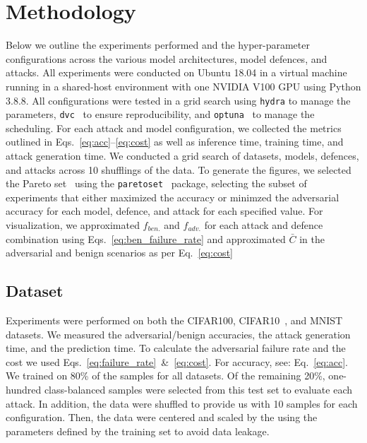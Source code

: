 \section{Methodology}
\label{methods}
Below we outline the experiments performed and the hyper-parameter configurations across the various model architectures, model defences, and attacks. All experiments were conducted on Ubuntu 18.04 in a virtual machine running in a shared-host environment with one NVIDIA V100 GPU using Python 3.8.8. All configurations were tested in a grid search using \texttt{hydra} \citep{hydra} to manage the parameters, \texttt{dvc}~\citep{dvc} to ensure reproducibility, and \texttt{optuna}~\citep{optuna} to manage the scheduling. For each attack and model configuration, we collected the metrics outlined in Eqs.~\ref{eq:acc}--\ref{eq:cost} as well as inference time, training time, and attack generation time. We conducted a grid search of datasets, models, defences, and attacks across 10 shufflings of the data. To generate the figures, we selected the Pareto set~\cite{jahan2016multi} using the \texttt{paretoset}~\citep{paretoset} package, selecting the subset of experiments that either maximized the accuracy or minimzed the adversarial accuracy for each model, defence, and attack for each specified value. For visualization, we approximated $f_{ben.}$ and $f_{adv.}$ for each attack and defence combination using Eqs.~\ref{eq:ben_failure_rate} and approximated $\bar{C}$ in the adversarial and benign scenarios as per Eq.~\ref{eq:cost}

\subsection{Dataset}
\label{dataset}
Experiments were performed on both the CIFAR100, CIFAR10~\citep{cifar}, and MNIST~\citep{mnist} datasets. We measured the adversarial/benign accuracies, the attack generation time, and the prediction time. To calculate the adversarial failure rate and the cost we used Eqs.~\ref{eq:failure_rate}~\&~\ref{eq:cost}. For accuracy, see: Eq.~\ref{eq:acc}. We trained on 80\% of the samples for all datasets. Of the remaining 20\%, one-hundred class-balanced samples were selected from this test set to evaluate each attack. In addition, the data were shuffled to provide us with 10 samples for each configuration. Then, the data were centered and scaled by the using the parameters defined by the training set to avoid data leakage.

